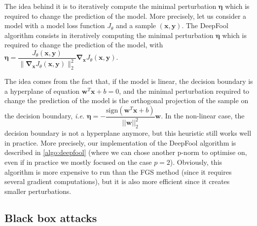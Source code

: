 \documentclass[11pt,twocolumn,letterpaper]{article}
\begin{document}
The idea behind it is to iteratively compute the minimal perturbation $\bm{\eta}$ which is required to change the prediction of the model. More precisely, let us consider a model with a model loss function $J_{\theta}$ and a sample $(\bm{x}, \bm{y})$. The DeepFool algorithm consists in iteratively computing the minimal perturbation $\bm{\eta}$ which is required to change the prediction of the model, with $\bm{\eta} = \dfrac{J_{\theta}(\bm{x}, \bm{y})}{\|\bm{\nabla}_{\bm{x}} J_{\theta}(\bm{x}, \bm{y})\|_2^2} \bm{\nabla}_{\bm{x}} J_{\theta}(\bm{x}, \bm{y})$. 

The idea comes from the fact that, if the model is linear, the decision boundary is a hyperplane of equation $\bm{w}^T\bm{x} + b = 0$, and the minimal perturbation required to change the prediction of the model is the orthogonal projection of the sample on the decision boundary, \textit{i.e.} $\bm{\eta} = - \dfrac{\text{sign}(\bm{w}^T\bm{x} + b)}{||\bm{w}||_2^2} \bm{w}$. In the non-linear case, the decision boundary is not a hyperplane anymore, but this heuristic still works well in practice. More precisely, our implementation of the DeepFool algorithm is described in \ref{algo:deepfool} (where we can chose another p-norm to optimise on, even if in practice we mostly focused on the case $p=2$).
Obviously, this algorithm is more expensive to run than the FGS method (since it requires several gradient computations), but it is also more efficient since it creates smaller perturbations.

\subsection{Black box attacks}

\paragraph{}
\end{document}
